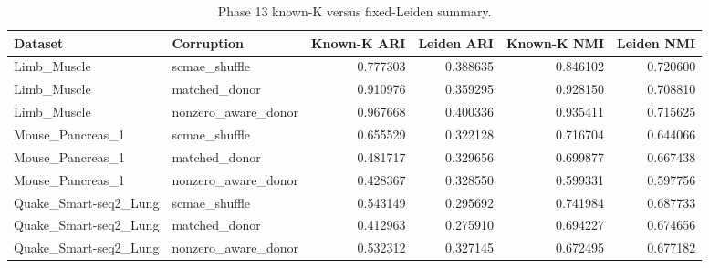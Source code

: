 \begin{table}[ht]
\centering
\caption{Phase 13 known-K versus fixed-Leiden summary.}
\label{tab:generated-phase13-nonoracle}
\begin{tabular}{llrrrr}
\toprule
Dataset & Corruption & Known-K ARI & Leiden ARI & Known-K NMI & Leiden NMI \\
\midrule
Limb\_Muscle & scmae\_shuffle & 0.777303 & 0.388635 & 0.846102 & 0.720600 \\
Limb\_Muscle & matched\_donor & 0.910976 & 0.359295 & 0.928150 & 0.708810 \\
Limb\_Muscle & nonzero\_aware\_donor & 0.967668 & 0.400336 & 0.935411 & 0.715625 \\
Mouse\_Pancreas\_1 & scmae\_shuffle & 0.655529 & 0.322128 & 0.716704 & 0.644066 \\
Mouse\_Pancreas\_1 & matched\_donor & 0.481717 & 0.329656 & 0.699877 & 0.667438 \\
Mouse\_Pancreas\_1 & nonzero\_aware\_donor & 0.428367 & 0.328550 & 0.599331 & 0.597756 \\
Quake\_Smart-seq2\_Lung & scmae\_shuffle & 0.543149 & 0.295692 & 0.741984 & 0.687733 \\
Quake\_Smart-seq2\_Lung & matched\_donor & 0.412963 & 0.275910 & 0.694227 & 0.674656 \\
Quake\_Smart-seq2\_Lung & nonzero\_aware\_donor & 0.532312 & 0.327145 & 0.672495 & 0.677182 \\
\bottomrule
\end{tabular}
\end{table}
